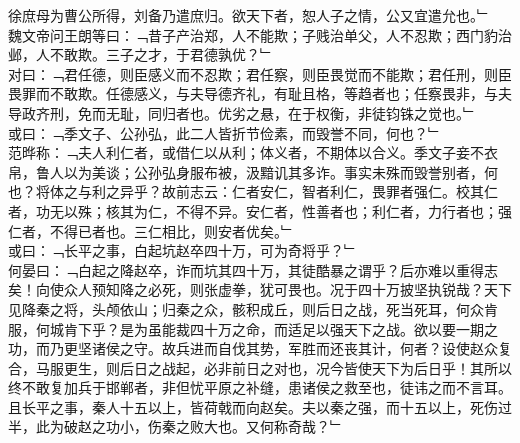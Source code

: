 徐庶母为曹公所得，刘备乃遣庶归。欲天下者，恕人子之情，公又宜遣允也。﹂
\\
魏文帝问王朗等曰：﹁昔子产治郑，人不能欺；子贱治单父，人不忍欺；西门豹治邺，人不敢欺。三子之才，于君德孰优？﹂\\
对曰：﹁君任德，则臣感义而不忍欺；君任察，则臣畏觉而不能欺；君任刑，则臣畏罪而不敢欺。任德感义，与夫导德齐礼，有耻且格，等趋者也；任察畏非，与夫导政齐刑，免而无耻，同归者也。优劣之悬，在于权衡，非徒钧铢之觉也。﹂\\
或曰：﹁季文子、公孙弘，此二人皆折节俭素，而毁誉不同，何也？﹂\\
范晔称：﹁夫人利仁者，或借仁以从利；体义者，不期体以合义。季文子妾不衣帛，鲁人以为美谈；公孙弘身服布被，汲黯讥其多诈。事实未殊而毁誉别者，何也？将体之与利之异乎？故前志云：仁者安仁，智者利仁，畏罪者强仁。校其仁者，功无以殊；核其为仁，不得不异。安仁者，性善者也；利仁者，力行者也；强仁者，不得已者也。三仁相比，则安者优矣。﹂
\\
或曰：﹁长平之事，白起坑赵卒四十万，可为奇将乎？﹂\\
何晏曰：﹁白起之降赵卒，诈而坑其四十万，其徒酷暴之谓乎？后亦难以重得志矣！向使众人预知降之必死，则张虚拳，犹可畏也。况于四十万披坚执锐哉？天下见降秦之将，头颅依山；归秦之众，骸积成丘，则后日之战，死当死耳，何众肯服，何城肯下乎？是为虽能裁四十万之命，而适足以强天下之战。欲以要一期之功，而乃更坚诸侯之守。故兵进而自伐其势，军胜而还丧其计，何者？设使赵众复合，马服更生，则后日之战起，必非前日之对也，况今皆使天下为后日乎！其所以终不敢复加兵于邯郸者，非但忧平原之补缝，患诸侯之救至也，徒讳之而不言耳。且长平之事，秦人十五以上，皆荷戟而向赵矣。夫以秦之强，而十五以上，死伤过半，此为破赵之功小，伤秦之败大也。又何称奇哉？﹂
\\
